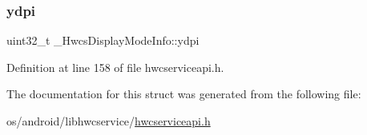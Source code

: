 \subsubsection{\texorpdfstring{ydpi}{ydpi}}
{\footnotesize\ttfamily uint32\+\_\+t \+\_\+\+Hwcs\+Display\+Mode\+Info\+::ydpi}



Definition at line 158 of file hwcserviceapi.\+h.



The documentation for this struct was generated from the following file\+:\begin{DoxyCompactItemize}
\item 
os/android/libhwcservice/\mbox{\hyperlink{hwcserviceapi_8h}{hwcserviceapi.\+h}}\end{DoxyCompactItemize}
